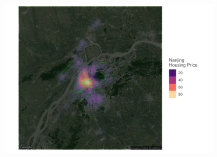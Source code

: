 \begin{figure}[h!]
\begin{scriptsize}
\begin{minipage}{0.328\textwidth}
        \includegraphics[width=\linewidth]{../figures/distribution_of_hp_and_broker/Nanjing.pdf}
    \end{minipage}


\end{scriptsize}
\end{figure}

